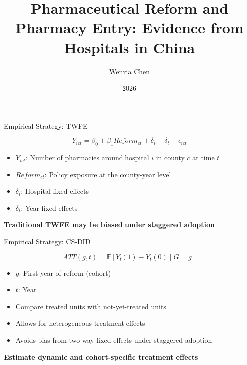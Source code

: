 \documentclass{beamer}
\title{Pharmaceutical Reform and Pharmacy Entry: Evidence from Hospitals in China}
\author{Wenxia Chen}
\date{2026}
\begin{document}
\frame{\titlepage}

\begin{frame}{Empirical Strategy: TWFE}

\[
Y_{ict} = \beta_0+\beta_1 Reform_{ct} + \delta_i + \delta_t + \epsilon_{ict}
\]

\vspace{0.4cm}

\begin{itemize}
    \item $Y_{ict}$: Number of pharmacies around hospital $i$ in county $c$ at time $t$
    \item $Reform_{ct}$: Policy exposure at the county-year level
    \item $\delta_i$: Hospital fixed effects
    \item $\delta_t$: Year fixed effects
\end{itemize}

\vspace{0.4cm}

\centering
\textbf{Traditional TWFE may be biased under staggered adoption}

\end{frame}

\begin{frame}{Empirical Strategy: CS-DID}

\[
ATT(g,t) = \mathbb{E}[Y_t(1) - Y_t(0) \mid G = g]
\]

\vspace{0.4cm}

\begin{itemize}
    \item $g$: First year of reform (cohort)
    \item $t$: Year
    \item Compare treated units with not-yet-treated units
\end{itemize}

\vspace{0.4cm}

\begin{itemize}
    \item Allows for heterogeneous treatment effects
    \item Avoids bias from two-way fixed effects under staggered adoption
\end{itemize}

\vspace{0.4cm}

\centering
\textbf{Estimate dynamic and cohort-specific treatment effects}

\end{frame}
\end{document}

